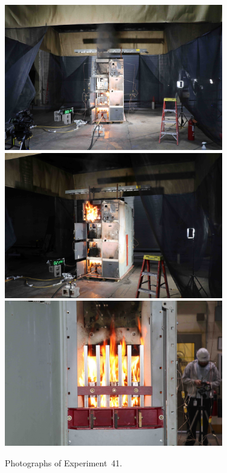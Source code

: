 \begin{figure}[p]
\centering
\includegraphics[height=2.50in]{../FIGURES/Test_41_5_min_20_s} \\
\includegraphics[height=2.50in]{../FIGURES/Test_41_21_min_22_s} \\
\includegraphics[height=2.50in]{../FIGURES/Test_41_rear}
\caption[Photographs of Experiment~41]{Photographs of Experiment~41.}
\label{fig:Test_41_photos}
\end{figure}






\clearpage

